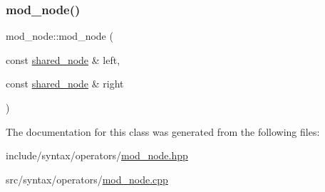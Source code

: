 \subsubsection{\texorpdfstring{mod\+\_\+node()}{mod\_node()}}
{\footnotesize\ttfamily mod\+\_\+node\+::mod\+\_\+node (\begin{DoxyParamCaption}\item[{const \hyperlink{namespacejawe_a3f307481d921b6cbb50cc8511fc2b544}{shared\+\_\+node} \&}]{left,  }\item[{const \hyperlink{namespacejawe_a3f307481d921b6cbb50cc8511fc2b544}{shared\+\_\+node} \&}]{right }\end{DoxyParamCaption})}



The documentation for this class was generated from the following files\+:\begin{DoxyCompactItemize}
\item 
include/syntax/operators/\hyperlink{mod__node_8hpp}{mod\+\_\+node.\+hpp}\item 
src/syntax/operators/\hyperlink{mod__node_8cpp}{mod\+\_\+node.\+cpp}\end{DoxyCompactItemize}
